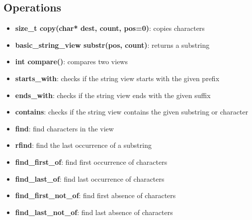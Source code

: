 \documentclass{report}
\begin{document}
        \subsection{Operations}
        \begin{itemize}
            \item \textbf{size\_t copy(char* dest, count, pos=0)}: copies characters
            \item \textbf{basic\_string\_view substr(pos, count)}: returns a substring
            \item \textbf{int compare()}: compares two views
            \item \textbf{starts\_with}: checks if the string view starts with the given prefix
            \item \textbf{ends\_with}: checks if the string view ends with the given suffix
            \item \textbf{contains}: checks if the string view contains the given substring or character
            \item \textbf{find}: find characters in the view
            \item \textbf{rfind}: find the last occurrence of a substring
            \item \textbf{find\_first\_of}: find first occurrence of characters
            \item \textbf{find\_last\_of}: find last occurrence of characters
            \item \textbf{find\_first\_not\_of}: find first absence of characters
            \item \textbf{find\_last\_not\_of}: find last absence of characters
        \end{itemize}
\end{document}
